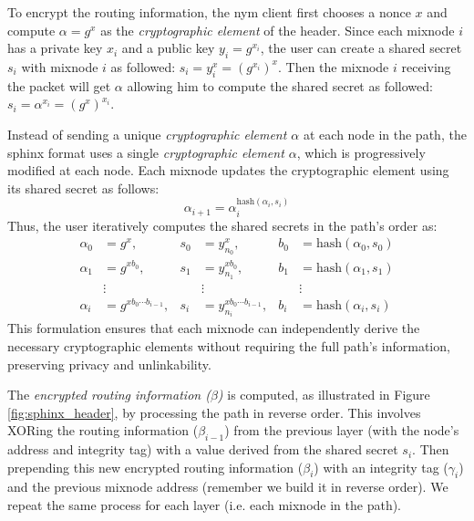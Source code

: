 To encrypt the routing information, the nym client first chooses a nonce $x$ and compute $\alpha = g^x$ as the \textit{cryptographic element} of the header.
Since each mixnode $i$ has a private key $x_i$ and a public key $y_i = g^{x_i}$, the user can create a shared secret $s_i$ with mixnode $i$ as followed: $s_i = y_i^x = (g^{x_i})^x$. 
Then the mixnode $i$ receiving the packet will get $\alpha$ allowing him to compute the shared secret as followed: $s_i = \alpha^{x_i} = (g^x)^{x_i}$.

Instead of sending a unique \textit{cryptographic element $\alpha$} at each node in the path, the sphinx format uses a single \textit{cryptographic element $\alpha$}, which is progressively modified at each node. 
Each mixnode updates the cryptographic element using its shared secret as follows:  
$$\alpha_{i+1} = \alpha_i^{\text{hash}(\alpha_i, s_i)}$$
Thus, the user iteratively computes the shared secrets in the path's order as: 
$$
\begin{aligned}
    \alpha_0 &= g^{x}, & s_0 &= y_{n_0}^{x}, & b_0 &= \text{hash}(\alpha_0, s_0) \\
    \alpha_1 &= g^{x b_0}, & s_1 &= y_{n_1}^{x b_0}, & b_1 &= \text{hash}(\alpha_1, s_1) \\
    &\vdots & &\vdots & &\vdots \\
    \alpha_i &= g^{x b_0 \cdots b_{i-1}}, & s_i &= y_{n_i}^{x b_0 \cdots b_{i-1}}, & b_i &= \text{hash}(\alpha_i, s_i)
\end{aligned}
$$
This formulation ensures that each mixnode can independently derive the necessary cryptographic elements without requiring the full path’s information, preserving privacy and unlinkability.  
\newline

The \textit{encrypted routing information ($\beta$)} is computed, as illustrated in Figure \ref{fig:sphinx_header}, by processing the path in reverse order. 
This involves XORing the routing information ($\beta_{i-1}$) from the previous layer (with the node's address and integrity tag) with a value derived from the shared secret $s_i$. 
Then prepending this new encrypted routing information ($\beta_i$) with an integrity tag ($\gamma_i$) and the previous mixnode address (remember we build it in reverse order).
We repeat the same process for each layer (i.e. each mixnode in the path).

